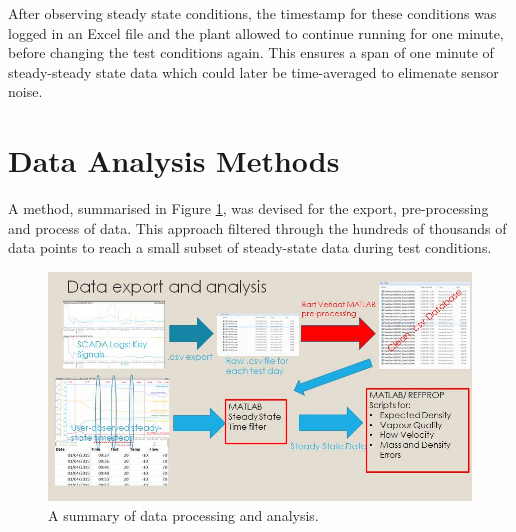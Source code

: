\documentclass{report}
\begin{document}
After observing steady state conditions, the timestamp for these conditions was logged in an Excel file and the plant allowed to continue running for one minute, before changing the test conditions again. This ensures a span of one minute of steady-steady state data which could later be time-averaged to elimenate sensor noise.
\FloatBarrier
\section{Data Analysis Methods} \label{analysis}
A method, summarised in Figure \ref{fig:processing}, was devised for the export, pre-processing and process of data. This approach filtered through the hundreds of thousands of data points to reach a small subset of steady-state data during test conditions. \\
\FloatBarrier
\begin{figure}[h]
\includegraphics[width=\textwidth]{processing}
\caption{A summary of data processing and analysis.}
\label{fig:processing}
\end{figure}
\FloatBarrier
\end{document}
